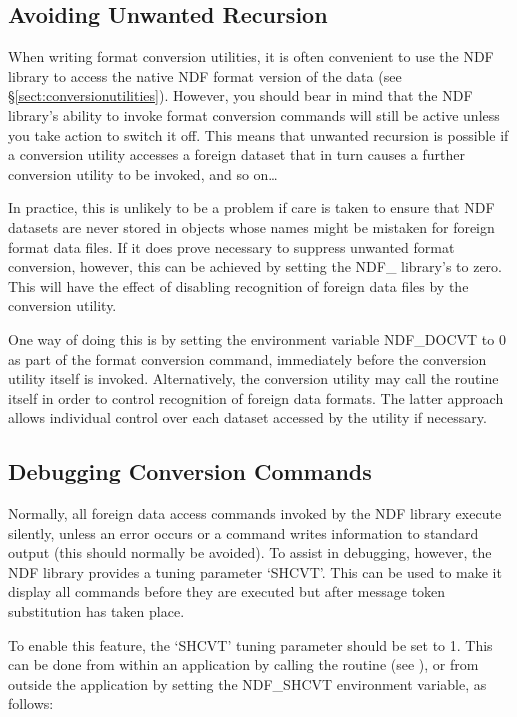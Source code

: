 \subsection{Avoiding Unwanted Recursion}

When writing format conversion utilities, it is often convenient to
use the NDF library to access the native NDF format version of the
data (see \S\ref{sect:conversionutilities}). However, you should bear
in mind that the NDF library's ability to invoke format conversion
commands will still be active unless you take action to switch it
off. This means that unwanted recursion is possible if a conversion
utility accesses a foreign dataset that in turn causes a further
conversion utility to be invoked, and so on\ldots

In practice, this is unlikely to be a problem if care is taken to
ensure that NDF datasets are never stored in objects whose names might
be mistaken for foreign format data files. If it does prove necessary
to suppress unwanted format conversion, however, this can be achieved
by setting the NDF\_ library's  to zero.  This will have the
effect of disabling recognition of foreign data files by the
conversion utility.

One way of doing this is by setting the environment variable
NDF\_DOCVT to 0 as part of the format conversion command, immediately
before the conversion utility itself is invoked. Alternatively, the
conversion utility may call the 
routine itself in order to control recognition of foreign data
formats. The latter approach allows individual control over each
dataset accessed by the utility if necessary.

\subsection{Debugging Conversion Commands}

Normally, all foreign data access commands invoked by the NDF library
execute silently, unless an error occurs or a command writes
information to standard output (this should normally be avoided). To
assist in debugging, however, the NDF library provides a tuning
parameter `SHCVT'. This can be used to make it display all commands
before they are executed but after message token substitution has
taken place.

To enable this feature, the `SHCVT' tuning parameter should be set to
1. This can be done from within an application by calling the
 routine (see
), or from outside the
application by setting the NDF\_SHCVT environment variable, as
follows:

